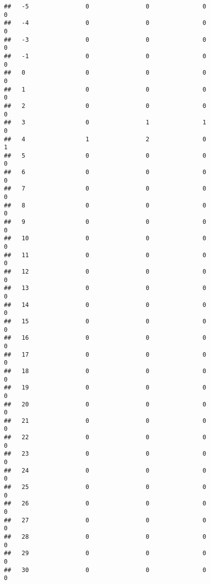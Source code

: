 \documentclass[]{article}
\begin{document}
\begin{verbatim}
##   -5                0                0               0                0
##   -4                0                0               0                0
##   -3                0                0               0                0
##   -1                0                0               0                0
##   0                 0                0               0                0
##   1                 0                0               0                0
##   2                 0                0               0                0
##   3                 0                1               1                0
##   4                 1                2               0                1
##   5                 0                0               0                0
##   6                 0                0               0                0
##   7                 0                0               0                0
##   8                 0                0               0                0
##   9                 0                0               0                0
##   10                0                0               0                0
##   11                0                0               0                0
##   12                0                0               0                0
##   13                0                0               0                0
##   14                0                0               0                0
##   15                0                0               0                0
##   16                0                0               0                0
##   17                0                0               0                0
##   18                0                0               0                0
##   19                0                0               0                0
##   20                0                0               0                0
##   21                0                0               0                0
##   22                0                0               0                0
##   23                0                0               0                0
##   24                0                0               0                0
##   25                0                0               0                0
##   26                0                0               0                0
##   27                0                0               0                0
##   28                0                0               0                0
##   29                0                0               0                0
##   30                0                0               0                0

\end{verbatim}
\end{document}
